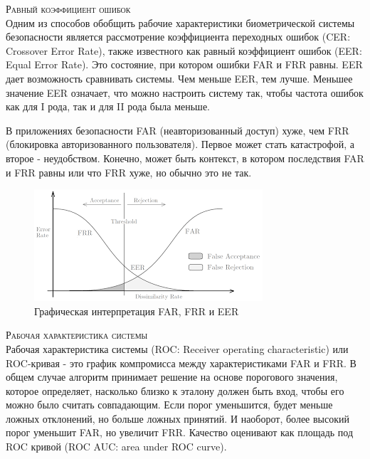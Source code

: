 \documentclass[12pt]{article}
\begin{document}
    \par \textsc{Равный коэффициент ошибок} \\
    \noindent Одним из способов обобщить рабочие характеристики биометрической системы безопасности является рассмотрение коэффициента переходных ошибок (CER: Crossover Error Rate), также известного как равный коэффициент ошибок (EER: Equal Error Rate). Это состояние, при котором ошибки FAR и FRR равны. EER дает возможность сравнивать системы. Чем меньше EER, тем лучше. Меньшее значение EER означает, что можно настроить систему так, чтобы частота ошибок как для I рода, так и для II рода была меньше. \\

    \par В приложениях безопасности FAR (неавторизованный доступ) хуже, чем FRR (блокировка авторизованного пользователя). Первое может стать катастрофой, а второе - неудобством. Конечно, может быть контекст, в котором последствия FAR и FRR равны или что FRR хуже, но обычно это не так. \\

    \begin{figure}[h]
        \centering
        \includegraphics{EER.png}
        \caption{Графическая интерпретация FAR, FRR и EER}
        \label{sec:Overview:Metrics:fig:FAR_FRR_EER}
    \end{figure}
    \vspace{10mm}

    \par \textsc{Рабочая характеристика системы} \\
    \noindent Рабочая характеристика системы (ROC: Receiver operating characteristic) или ROC-кривая - это график компромисса между характеристиками FAR и FRR. В общем случае алгоритм принимает решение на основе порогового значения, которое определяет, насколько близко к эталону должен быть вход, чтобы его можно было считать совпадающим. Если порог уменьшится, будет меньше ложных отклонений, но больше ложных принятий. И наоборот, более высокий порог уменьшит FAR, но увеличит FRR. Качество оценивают как площадь под ROC кривой (ROC AUC: area under ROC curve).
\end{document}
